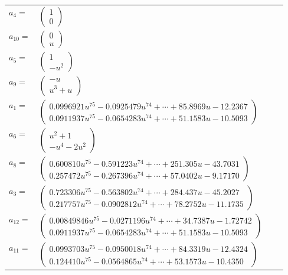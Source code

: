 \documentclass[1p]{elsarticle_modified}
\theoremstyle{definition}
\begin{document}
\begin{tabular}{m{7pt} m{180pt} m{7pt} m{180pt} }
\flushright $a_{4}=$&$\begin{pmatrix}1\\0\end{pmatrix}$ \\
\flushright $a_{10}=$&$\begin{pmatrix}0\\u\end{pmatrix}$ \\
\flushright $a_{5}=$&$\begin{pmatrix}1\\- u^2\end{pmatrix}$ \\
\flushright $a_{9}=$&$\begin{pmatrix}- u\\u^3+u\end{pmatrix}$ \\
\flushright $a_{1}=$&$\begin{pmatrix}0.0996921 u^{75}-0.0925479 u^{74}+\cdots+85.8969 u-12.2367\\0.0911937 u^{75}-0.0654283 u^{74}+\cdots+51.1583 u-10.5093\end{pmatrix}$ \\
\flushright $a_{6}=$&$\begin{pmatrix}u^2+1\\- u^4-2 u^2\end{pmatrix}$ \\
\flushright $a_{8}=$&$\begin{pmatrix}0.600810 u^{75}-0.591223 u^{74}+\cdots+251.305 u-43.7031\\0.257472 u^{75}-0.267396 u^{74}+\cdots+57.0402 u-9.17170\end{pmatrix}$ \\
\flushright $a_{3}=$&$\begin{pmatrix}0.723306 u^{75}-0.563802 u^{74}+\cdots+284.437 u-45.2027\\0.217757 u^{75}-0.0902812 u^{74}+\cdots+78.2752 u-11.1735\end{pmatrix}$ \\
\flushright $a_{12}=$&$\begin{pmatrix}0.00849846 u^{75}-0.0271196 u^{74}+\cdots+34.7387 u-1.72742\\0.0911937 u^{75}-0.0654283 u^{74}+\cdots+51.1583 u-10.5093\end{pmatrix}$ \\
\flushright $a_{11}=$&$\begin{pmatrix}0.0993703 u^{75}-0.0950018 u^{74}+\cdots+84.3319 u-12.4324\\0.124410 u^{75}-0.0564865 u^{74}+\cdots+53.1573 u-10.4350\end{pmatrix}$ \\

\end{tabular}
\end{document}
